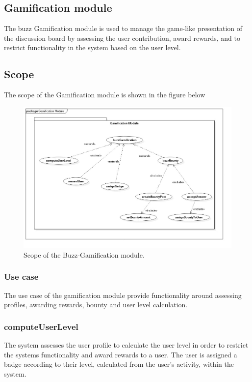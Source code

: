 \subsection{Gamification module}
\par {The buzz Gamification module is used to manage the game-like presentation of the discussion board by assessing the user contribution, award rewards, and to restrict functionality in the system based on the user level. }
\subsection{Scope}
\par {The scope of the Gamification module is shown in the figure  below}
\begin{figure}[h!]
\includegraphics[width=\linewidth]
{Diagrams/Gamification_Scope.jpeg}
\caption {Scope of the Buzz-Gamification module.}
\end{figure}

\subsubsection{Use case}
\par{The use case of the gamification module provide functionality around assessing profiles, awarding rewards, bounty and user level calculation. }

\subsubsection{computeUserLevel}
\par{The system assesses the user profile to calculate the user level in order to restrict the systems functionality and award rewards to a user. The user is assigned a badge according to their level, calculated from the user’s activity, within the system.}

